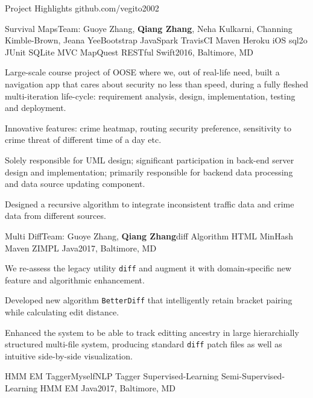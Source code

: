 \documentclass{resume} %
\begin{document}
\begin{rSection}{Project Highlights \faGithub\hspace{0.1cm} github.com/vegito2002}

\begin{rSubsection}{Survival Maps}{Team: Guoye Zhang, {\bf Qiang Zhang}, Neha Kulkarni, Channing Kimble-Brown, Jeana Yee}{Bootstrap JavaSpark TravisCI Maven Heroku iOS sql2o JUnit SQLite MVC MapQuest RESTful Swift}{2016, Baltimore, MD}
\item Large-scale course project of OOSE where we, out of real-life need, built a navigation app that cares about security no less than speed, during a fully fleshed multi-iteration life-cycle: requirement analysis, design, implementation, testing and deployment.
\item Innovative features: crime heatmap, routing security preference, sensitivity to crime threat of different time of a day etc.
\item Solely responsible for UML design; significant participation in back-end server design and implementation; primarily responsible for backend data processing and data source updating component.
\item Designed a recursive algorithm to integrate inconsistent traffic data and crime data from different sources.
\end{rSubsection}
\begin{rSubsection}{Multi Diff}{Team: Guoye Zhang, {\bf Qiang Zhang}}{diff Algorithm HTML MinHash Maven ZIMPL Java}{2017, Baltimore, MD}
\item We re-assess the legacy utility \texttt{diff} and augment it with domain-specific new feature and algorithmic enhancement.
\item Developed new algorithm \texttt{BetterDiff} that intelligently retain bracket pairing while calculating edit distance.
\item Enhanced the system to be able to track editting ancestry in large hierarchially structured multi-file system, producing standard \texttt{diff} patch files as well as intuitive side-by-side visualization.
\end{rSubsection}
\begin{rSubsection}{HMM EM Tagger}{Myself}{NLP Tagger Supervised-Learning Semi-Supervised-Learning HMM EM Java}{2017, Baltimore, MD}

\end{rSubsection}
\end{rSection}
\end{document}
